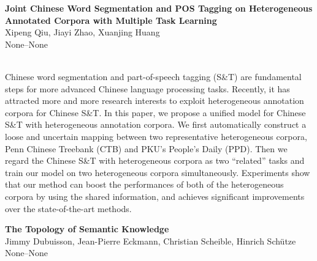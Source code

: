 \documentclass[twoside,makeidx]{book}
\renewcommand{\normalsize}{\fontsize{8}{9}\selectfont}
\renewcommand{\small}{\fontsize{7}{8}\selectfont}
\begin{document}
\par\vspace{2em}\noindent%
\begin{minipage}{\linewidth}%
\begin{center}
\textbf{\normalsize Joint Chinese Word Segmentation and POS Tagging on Heterogeneous Annotated Corpora with Multiple Task Learning}\\
\normalsize  Xipeng Qiu,  Jiayi Zhao,  Xuanjing Huang\\
{\small None--None}\\
\end{center}
\end{minipage}\\[0.5em]
\nopagebreak%
\noindent%
{\small Chinese word segmentation and part-of-speech tagging (S\&T) are fundamental steps for more advanced Chinese language processing tasks. Recently, it has attracted more and more research interests to exploit heterogeneous annotation corpora for Chinese S\&T. In this paper, we propose a unified model for Chinese S\&T with heterogeneous annotation corpora. We first automatically construct a loose and uncertain mapping between two representative heterogeneous corpora, Penn Chinese Treebank (CTB) and PKU's People's Daily (PPD). Then we regard the Chinese S\&T with heterogeneous corpora as two ``related'' tasks and train our model on two heterogeneous corpora simultaneously. Experiments show that our method can boost the performances of both of the heterogeneous corpora by using the shared information, and achieves significant improvements over the state-of-the-art methods.}
\par\vspace{2em}\noindent%
\begin{minipage}{\linewidth}%
\begin{center}
\textbf{\normalsize The Topology of Semantic Knowledge}\\
\normalsize  Jimmy Dubuisson,  Jean-Pierre Eckmann,  Christian Scheible,  Hinrich Sch\"{u}tze\\
{\small None--None}\\
\end{center}
\end{minipage}\\[0.5em]
\nopagebreak%
\noindent%
\end{document}
